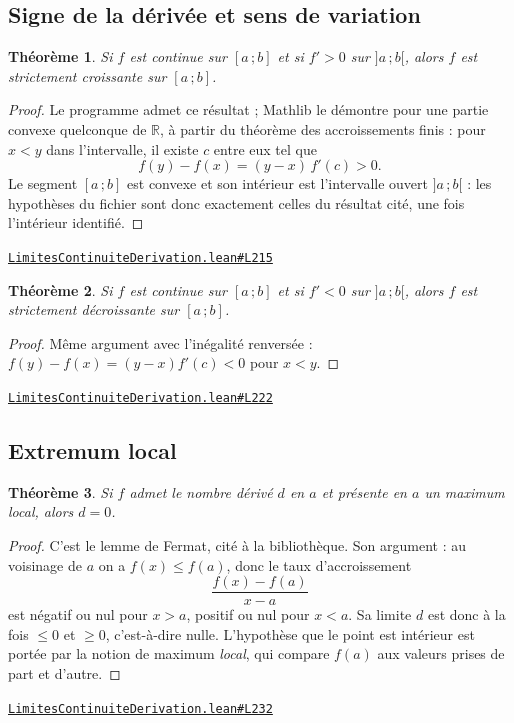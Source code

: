 \documentclass[11pt,a4paper]{article}
\theoremstyle{definition}
\theoremstyle{plain}
\newtheorem{theoreme}{Théorème}
\newcommand{\source}[2]{\par\smallskip\noindent\hfill{\footnotesize\href{#1}{\texttt{#2}}}\par\smallskip}
\begin{document}
\subsection{Signe de la dérivée et sens de variation}

\begin{theoreme}
Si $f$ est continue sur $[a\,;b]$ et si $f' > 0$ sur $]a\,;b[$, alors $f$ est strictement
croissante sur $[a\,;b]$.
\end{theoreme}

\begin{proof}
Le programme admet ce résultat ; Mathlib le démontre pour une partie convexe quelconque de
$\mathbb{R}$, à partir du théorème des accroissements finis : pour $x < y$ dans
l'intervalle, il existe $c$ entre eux tel que
\[ f(y) - f(x) = (y - x)\,f'(c) > 0 . \]
Le segment $[a\,;b]$ est convexe et son intérieur est l'intervalle ouvert $]a\,;b[$ : les
hypothèses du fichier sont donc exactement celles du résultat cité, une fois l'intérieur
identifié.
\end{proof}
\source{https://github.com/Commutator-IO/learn-lean/blob/main/courses/02-lycee/04-limites-continuite-derivation/LimitesContinuiteDerivation.lean\#L215}{LimitesContinuiteDerivation.lean\#L215}

\begin{theoreme}
Si $f$ est continue sur $[a\,;b]$ et si $f' < 0$ sur $]a\,;b[$, alors $f$ est strictement
décroissante sur $[a\,;b]$.
\end{theoreme}

\begin{proof}
Même argument avec l'inégalité renversée : $f(y) - f(x) = (y - x)f'(c) < 0$ pour $x < y$.
\end{proof}
\source{https://github.com/Commutator-IO/learn-lean/blob/main/courses/02-lycee/04-limites-continuite-derivation/LimitesContinuiteDerivation.lean\#L222}{LimitesContinuiteDerivation.lean\#L222}

\subsection{Extremum local}

\begin{theoreme}
Si $f$ admet le nombre dérivé $d$ en $a$ et présente en $a$ un maximum local, alors
$d = 0$.
\end{theoreme}

\begin{proof}
C'est le lemme de Fermat, cité à la bibliothèque. Son argument : au voisinage de $a$ on a
$f(x) \le f(a)$, donc le taux d'accroissement
\[ \frac{f(x) - f(a)}{x - a} \]
est négatif ou nul pour $x > a$, positif ou nul pour $x < a$. Sa limite $d$ est donc à la
fois $\le 0$ et $\ge 0$, c'est-à-dire nulle. L'hypothèse que le point est intérieur est
portée par la notion de maximum \emph{local}, qui compare $f(a)$ aux valeurs prises de part
et d'autre.
\end{proof}
\source{https://github.com/Commutator-IO/learn-lean/blob/main/courses/02-lycee/04-limites-continuite-derivation/LimitesContinuiteDerivation.lean\#L232}{LimitesContinuiteDerivation.lean\#L232}
\end{document}
